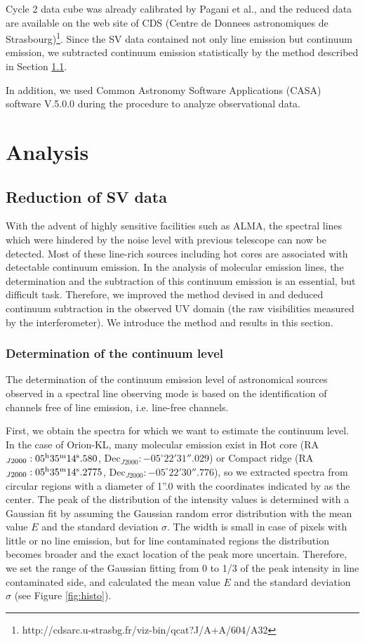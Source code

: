 Cycle 2 data cube was already calibrated by Pagani et al., and the reduced data are available on 
the web site of CDS (Centre de Donnees astronomiques de Strasbourg)\footnote{http://cdsarc.u-strasbg.fr/viz-bin/qcat?J/A+A/604/A32}.
Since the SV data contained not only line emission but continuum emission, 
we subtracted continuum emission statistically by the method described in Section \ref{sec:Statcont}.

In addition, we used Common Astronomy Software Applications (CASA) software V.5.0.0 \citep{McMullin+2007} during the procedure to analyze observational data.

\newpage
\section{Analysis}
\subsection{Reduction of SV data}
\label{sec:Statcont}

With the advent of highly sensitive facilities such as ALMA, the spectral lines which were hindered 
by the noise level with previous telescope can now be detected.
Most of these line-rich sources including hot cores are associated with detectable continuum emission.
In the analysis of molecular emission lines, the determination and the subtraction of this continuum 
emission is an essential, but difficult task. 
Therefore, we improved the method devised in \citet{Sanchez-Monge+2017} and deduced continuum subtraction 
in the observed UV domain (the raw visibilities measured by the interferometer).
We introduce the method and results in this section.

\subsubsection*{Determination of the continuum level}
The determination of the continuum emission level of astronomical sources observed in a spectral line 
observing mode is based on the identification of channels free of line emission, i.e. line-free channels.

First, we obtain the spectra for which we want to estimate the continuum level.  
In the case of Orion-KL, many molecular emission exist in Hot core
(RA$_{J2000}: 05^{\rm{h}}35^{\rm{m}}14^{\rm{s}}.580$, Dec$_{J2000}:-05^{\circ}22'31''.029$) or 
Compact ridge (RA$_{J2000}: 05^{\rm{h}}35^{\rm{m}}14^{\rm{s}}.2775$, Dec$_{J2000}:-05^{\circ}22'30''.776$), 
so we extracted spectra from circular regions with a diameter of 1''.0  with the coordinates indicated by 
\citet{Hirota+2015} as the center.
The peak of the distribution of the intensity values is determined with a Gaussian fit 
by assuming the Gaussian random error distribution with the mean value $E$ and the standard deviation $\sigma$.
The width is small in case of pixels with little or no line emission, but for line contaminated 
regions the distribution becomes broader and the exact location of the peak more uncertain. 
Therefore, we set the range of the Gaussian fitting from 0 to 1/3 of the peak intensity in line contaminated side,
and calculated the mean value $E$ and the standard deviation $\sigma$ (see Figure \ref{fig:histo}). 

